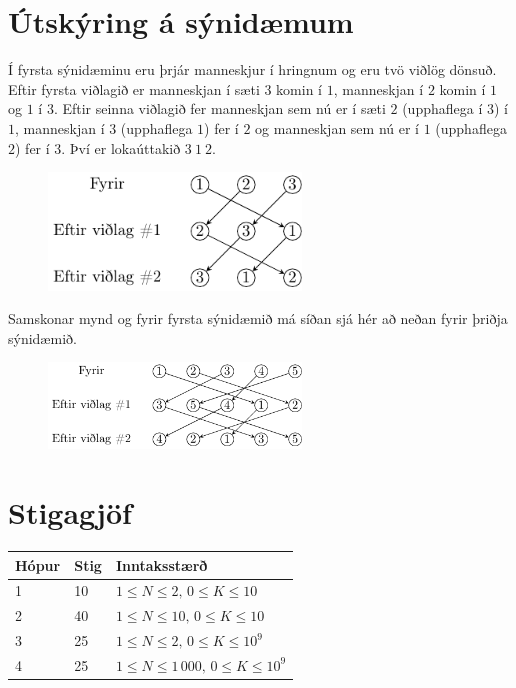 \section*{Útskýring á sýnidæmum}
Í fyrsta sýnidæminu eru þrjár manneskjur í hringnum og eru tvö viðlög dönsuð.
Eftir fyrsta viðlagið er manneskjan í sæti $3$ komin í $1$, manneskjan í $2$
komin í $1$ og $1$ í $3$. Eftir seinna viðlagið fer manneskjan sem nú er í sæti
$2$ (upphaflega í $3$) í $1$, manneskjan í $3$ (upphaflega $1$) fer í $2$ og
manneskjan sem nú er í $1$ (upphaflega $2$) fer í $3$. Því er lokaúttakið $3~1~2$.

\begin{figure}[!h]
  \centering
  \includegraphics[width=0.6\textwidth] {figures/fig1.pdf}
\end{figure}

Samskonar mynd og fyrir fyrsta sýnidæmið má síðan sjá hér að neðan fyrir þriðja sýnidæmið.
\begin{figure}[!h]
  \centering
  \includegraphics[width=0.6\textwidth] {figures/fig2.pdf}
\end{figure}

\section*{Stigagjöf}

\begin{tabular}{|l|l|l|}
\hline
Hópur & Stig & Inntaksstærð \\ \hline
1 & 10 & $1 \leq N \leq 2,\,0 \leq K \leq 10$ \\ \hline
2 & 40 & $1 \leq N \leq 10,\,0 \leq K \leq 10$ \\ \hline
3 & 25 & $1 \leq N \leq 2,\,0 \leq K \leq 10^9$ \\ \hline
4 & 25 & $1 \leq N \leq 1\,000,\,0 \leq K \leq 10^9$ \\ \hline
\end{tabular}
